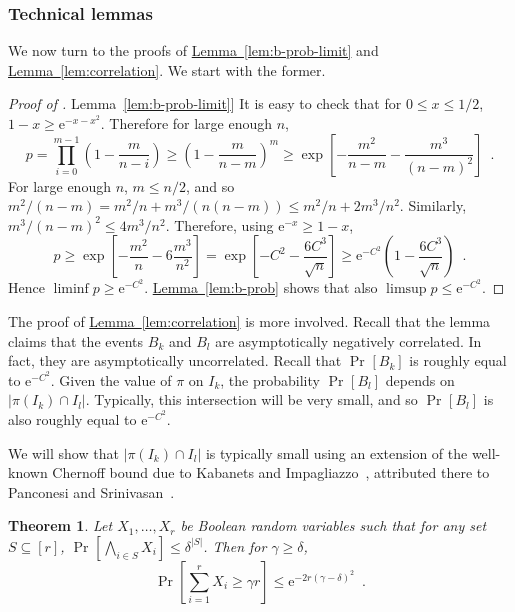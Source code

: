 \documentclass[11pt]{article}
\numberwithin{equation}{section}
\newtheorem{theorem}{Theorem}[section]
\theoremstyle{definition}
\theoremstyle{plain}
\newcommand{\eee}{\mathrm e}
\newcommand{\expref}[2]{\hyperref[#2]{#1~\ref{#2}}}
\theoremstyle{plain}
\theoremstyle{definition}
\newcommand{\PROB}[2][]{\Pr_{#1} \left[ #2 \right]}
\newcommand{\prob}[2][]{\Pr_{#1} [ #2 ]}
\newcommand{\eqperiod}{\enspace .}
\begin{document}
\subsubsection{Technical lemmas}

We now turn to the proofs of \expref{Lemma}{lem:b-prob-limit} and \expref{Lemma}{lem:correlation}. We start with the former.

\begin{proof}[Proof of \expref{Lemma}{lem:b-prob-limit}]
 It is easy to check that for $0 \leq x \leq 1/2$, $1-x \geq \eee^{-x-x^2}$. Therefore for large enough $n$,
\begin{equation}
 p = \prod_{i=0}^{m-1} \left(1 - \frac{m}{n-i}\right) \geq
 \left(1 - \frac{m}{n-m}\right)^m \geq
 \exp \left[ -\frac{m^2}{n-m}-\frac{m^3}{(n-m)^2} \right] \eqperiod
\end{equation}
 For large enough $n$, $m \leq n/2$, and so $m^2/(n-m) = m^2/n + m^3/(n(n-m)) \leq m^2/n + 2m^3/n^2$. Similarly, $m^3/(n-m)^2 \leq 4m^3/n^2$. Therefore, using $\eee^{-x} \geq 1-x$,
\begin{equation}
 p \geq \exp \left[ -\frac{m^2}{n} - 6\frac{m^3}{n^2} \right] = \exp \left[ -C^2 -\frac{6C^3}{\sqrt{n}} \right] \geq \eee^{-C^2} \left(1 - \frac{6C^3}{\sqrt{n}}\right) \eqperiod
\end{equation}
 Hence $\liminf p \geq \eee^{-C^2}$. \expref{Lemma}{lem:b-prob} shows that also $\limsup p \leq \eee^{-C^2}$.
\end{proof}

The proof of \expref{Lemma}{lem:correlation} is more involved. Recall that the lemma claims that the events $B_k$ and $B_l$ are asymptotically negatively correlated. In fact, they are asymptotically uncorrelated. Recall that $\prob{B_k}$ is roughly equal to $\eee^{-C^2}$. Given the value of $\pi$ on $I_k$, the probability $\prob{B_l}$ depends on $|\pi(I_k) \cap I_l|$. Typically, this intersection will be very small, and so $\prob{B_l}$ is also roughly equal to $\eee^{-C^2}$.

%
%
%

We will show that $|\pi(I_k) \cap I_l|$ is typically small using an
  extension of the well-known Chernoff bound due to Kabanets and
  Impagliazzo~\cite[Theorem 1.1]{KI}, attributed there to Panconesi and
  Srinivasan~\cite{PS}.


\begin{theorem} \label{thm:chernoff}
 Let $X_1,\ldots,X_r$ be Boolean random variables such that for any set $S \subseteq [r]$, $\prob{\bigwedge_{i \in S} X_i} \leq \delta^{|S|}$. Then for $\gamma \geq \delta$,
\begin{equation*}
 \PROB{\sum_{i=1}^r X_i \geq \gamma r} \leq \eee^{-2r(\gamma - \delta)^2} \eqperiod
\end{equation*}
\end{theorem}
\end{document}
